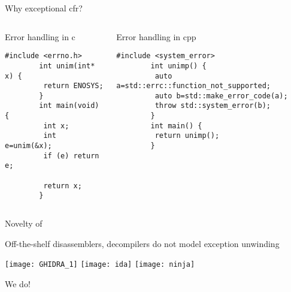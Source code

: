 \begin{frame}[fragile]{Why exceptional \gls{cfr}?}
  \begin{columns}[t]
    \begin{block}{Error handling in \gls{c}}
      \begin{lstlisting}[gobble=8]
        #include <errno.h>
        int unim(int* x) {
         return ENOSYS;
        }
        int main(void) {
         int x;
         int e=unim(&x);
         if (e) return e;

         return x;
        }
      \end{lstlisting}
    \end{block}

    \begin{block}{Error handling in \gls{cpp}}
      \begin{lstlisting}[gobble=8]
        #include <system_error>
        int unimp() {
         auto a=std::errc::function_not_supported;
         auto b=std::make_error_code(a);
         throw std::system_error(b);
        }
        int main() {
         return unimp();
        }
      \end{lstlisting}
    \end{block}
  \end{columns}
\end{frame}

\begin{frame}{Novelty of }
    \begin{outline}
      \1 Off-the-shelf \alert{disassemblers, decompilers} do not model \alert{exception unwinding}
      \begin{center}
        \texttt{[image: GHIDRA\_1]}
        \hspace{1cm}
        \texttt{[image: ida]}
        \hspace{1cm}
        \texttt{[image: ninja]}
      \end{center}
      \pause
      \1 \LARGE \alert{We do!}
    \end{outline}
\end{frame}
